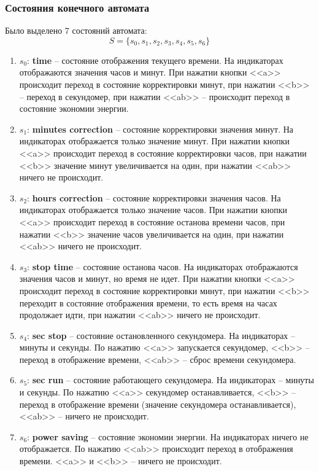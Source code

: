 \documentclass[10pt,a4paper,final]{article} %
\begin{document}
\subsubsection{Состояния конечного автомата}
Было выделено 7 состояний автомата: $$S = \{s_0, s_1, s_2, s_3, s_4, s_5, s_6\}$$
\begin{enumerate}[label=""]
	\item $s_0$: \textbf{time} -- состояние отображения текущего времени. На индикаторах отображаются значения часов и минут. При нажатии кнопки <<a>> происходит переход в состояние корректировки минут, при нажатии <<b>> -- переход в секундомер, при нажатии <<ab>> -- происходит переход в состояние экономии энергии.
	\item $s_1$: \textbf{minutes correction} -- состояние корректировки значения минут. На индикаторах отображается только значение минут. При нажатии кнопки <<a>> происходит переход в состояние корректировки часов, при нажатии <<b>> значение минут увеличивается на один, при нажатии <<ab>> ничего не происходит.
	\item $s_2$: \textbf{hours correction} -- состояние корректировки значения часов. На индикаторах отображается только значение часов. При нажатии кнопки <<a>> происходит переход в состояние останова времени часов, при нажатии <<b>> значение часов увеличивается на один, при нажатии <<ab>> ничего не происходит.
	\item $s_3$: \textbf{stop time} -- состояние останова часов. На индикаторах отображаются значения часов и минут, но время не идет.  При нажатии кнопки <<a>> происходит переход в состояние корректировки минут, при нажатии <<b>> переходит в состояние отображения времени, то есть время на часах продолжает идти, при нажатии <<ab>> ничего не происходит.
	\item $s_4$: \textbf{sec stop} -- состояние остановленного секундомера. На индикаторах -- минуты и секунды. По нажатию <<a>> запускается секундомер, <<b>> -- переход в отображение времени, <<ab>> -- сброс времени секундомера.
	\item $s_5$: \textbf{sec run} -- состояние работающего секундомера. На индикаторах -- минуты и секунды. По нажатию <<a>> секундомер останавливается, <<b>> -- переход в отображение времени (значение секундомера останавливается), <<ab>> -- ничего не происходит.
	\item $s_6$: \textbf{power saving} -- состояние экономии энергии. На индикаторах ничего не отображается. По нажатию  <<ab>> происходит переход в отображения времени.  <<a>> и  <<b>> -- ничего не происходит. 
\end{enumerate}
\end{document}
